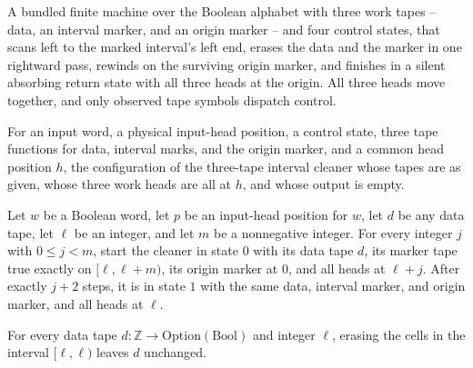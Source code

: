 \begin{definition}
\label{Turing.FinTM.emCallClearTM}
\leanok
{}
A bundled finite machine over the Boolean alphabet with three work tapes -- data, an
interval marker, and an origin marker -- and four control states, that scans left to the
marked interval's left end, erases the data and the marker in one rightward pass,
rewinds on the surviving origin marker, and finishes in a silent absorbing return state
with all three heads at the origin. All three heads move together, and only observed
tape symbols dispatch control.
\end{definition}

\begin{definition}
\label{Turing.FinTM.emCallClearCfg}
\leanok
{}
For an input word, a physical input-head position, a control state, three tape functions
for data, interval marks, and the origin marker, and a common head position $h$, the
configuration of the three-tape interval cleaner whose tapes are as given, whose three
work heads are all at $h$, and whose output is empty.
\end{definition}

\begin{lemma}
\label{Turing.FinTM.emCall_clear_left}
\leanok
{}
Let $w$ be a Boolean word, let $p$ be an input-head position for $w$, let $d$ be any
data tape, let $\ell$ be an integer, and let $m$ be a nonnegative integer. For every
integer $j$ with $0\le j<m$, start the cleaner in state $0$ with its data tape $d$, its
marker tape true exactly on $[\ell,\ell+m)$, its origin marker at $0$, and all heads at
$\ell+j$. After exactly $j+2$ steps, it is in state $1$ with the same data, interval
marker, and origin marker, and all heads at $\ell$.
\end{lemma}

\begin{lemma}
\label{Turing.FinTM.emCall_cleared_zero}
\leanok
{}
For every data tape $d : \mathbb{Z} \to \mathrm{Option}(\mathrm{Bool})$ and integer
$\ell$, erasing the cells in the interval $[\ell,\ell)$ leaves $d$ unchanged.
\end{lemma}

